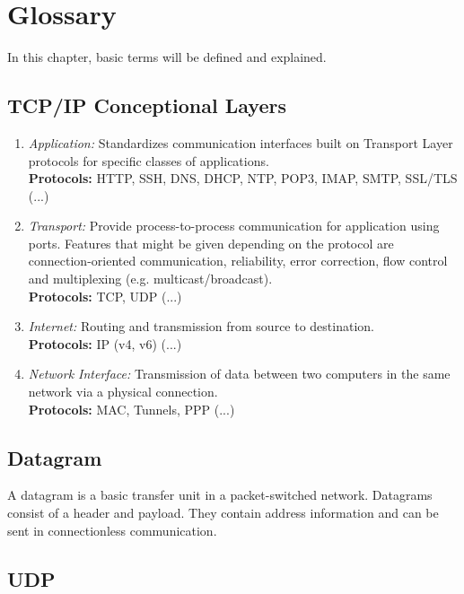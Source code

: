 \section{Glossary}

In this chapter, basic terms will be defined and explained.

\subsection{TCP/IP Conceptional Layers}

\begin{enumerate}
      \item \textit{Application:} Standardizes communication interfaces built on Transport Layer protocols for specific classes of applications.\\
            \textbf{Protocols:} \ac{HTTP}, \ac{SSH}, \ac{DNS}, \ac{DHCP}, \ac{NTP}, \ac{POP3}, \ac{IMAP}, \ac{SMTP}, \ac{SSL}/\ac{TLS} (...)
      \item \textit{Transport:} Provide process-to-process communication for application using ports. Features that might be given depending on the protocol are connection-oriented communication, reliability, error correction, flow control and multiplexing (e.g. multicast/broadcast).\\
            \textbf{Protocols:} \ac{TCP}, \ac{UDP} (...)
      \item \textit{Internet:} Routing and transmission from source to destination.\\
            \textbf{Protocols:} \ac{IP} (v4, v6) (...)
      \item \textit{Network Interface:} Transmission of data between two computers in the same network via a physical connection.\\
            \textbf{Protocols:} \ac{MAC}, Tunnels, \ac{PPP} (...)
\end{enumerate}

\subsection{Datagram}

A datagram is a basic transfer unit in a packet-switched network. Datagrams consist of a header and payload. They contain address information and can be sent in connectionless communication.

\subsection{UDP}

